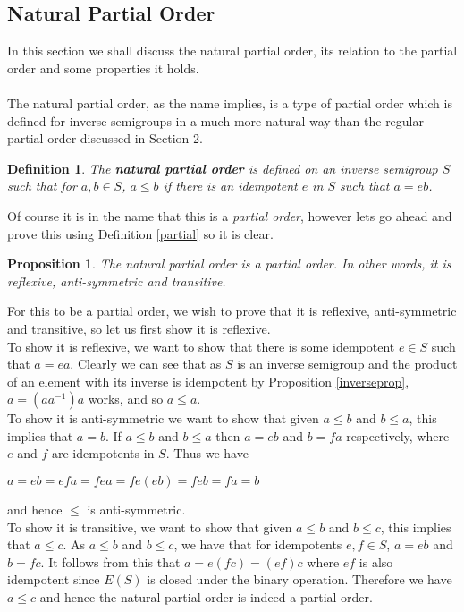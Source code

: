 \documentclass[12pt]{article}
\newtheorem{defn}[theorem]{Definition}
\newtheorem{prop}[theorem]{Proposition}
\begin{document}
\subsection{Natural Partial Order}
In this section we shall discuss the natural partial order, its relation to the partial order and some properties it holds.\\
\\The natural partial order, as the name implies, is a type of partial order which is defined for inverse semigroups in a much more natural way than the regular partial order discussed in Section 2.
\begin{defn}
	The \textbf{natural partial order} is defined on an inverse semigroup $S$ such that for $a,b \in S$, $a \leq b$ if there is an idempotent $e$ in $S$ such that $a=eb$.
\end{defn}
\noindent Of course it is in the name that this is a \textit{partial order}, however lets go ahead and prove this using Definition \ref{partial} so it is clear.
\begin{prop}
	The natural partial order is a partial order. In other words, it is reflexive, anti-symmetric and transitive.
\end{prop}
\proof
	For this to be a partial order, we wish to prove that it is reflexive, anti-symmetric and transitive, so let us first show it is reflexive.\\
	To show it is reflexive, we want to show that there is some idempotent $e \in S$ such that $a=ea$. Clearly we can see that as $S$ is an inverse semigroup and the product of an element with its inverse is idempotent by Proposition \ref{inverseprop}, $a =(aa^{-1})a$ works, and so $a \leq a$.\\
	To show it is anti-symmetric we want to show that given $a \leq b$ and $b \leq a$, this implies that $a=b$. If $ a\leq b$ and $b\leq a$ then $a=eb$ and $b=fa$ respectively, where $e$ and $f$ are idempotents in $S$. Thus we have
	\begin{center}
		$a=eb=efa=fea=fe(eb)=feb=fa=b$
	\end{center}
	and hence $\leq$ is anti-symmetric.\\
	To show it is transitive, we want to show that given $a \leq b$ and $b \leq c$, this implies that $a \leq c$. As $a \leq b$ and $b \leq c$, we have that for idempotents $e,f \in S$, $a=eb$ and $b=fc$. It follows from this that $a =e(fc)=(ef)c$ where $ef$ is also idempotent since $E(S)$ is closed under the binary operation. Therefore we have $a \leq c$ and hence the natural partial order is indeed a partial order.
\end{document}
